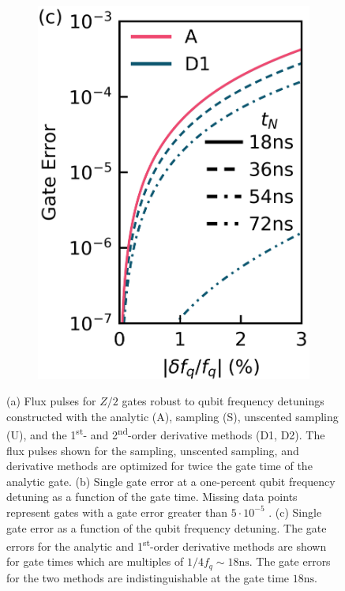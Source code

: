 \begin{figure}[ht]
\begin{subfigure}{.4\textwidth}
    \caption{\label{fig:staticb}}
  \end{subfigure}\hfill
  \begin{subfigure}{.23\textwidth}
    \includegraphics[width=\linewidth]{assets/f2c.png}
    \caption{\label{fig:staticc}}
  \end{subfigure}
  \caption{
    (a) Flux pulses for $Z/2$ gates robust to qubit frequency detunings constructed with the
    analytic (A), sampling (S), unscented sampling (U), and the 1\textsuperscript{st}-
    and 2\textsuperscript{nd}-order derivative methods (D1, D2). The flux pulses shown
    for the sampling, unscented sampling, and derivative methods are optimized
    for twice the gate time of the analytic gate.
    (b) Single gate error at a one-percent qubit frequency detuning as
    a function of the gate time. Missing
    data points represent gates with a gate error greater than $5 \cdot 10^{-5}$
    .
    (c) Single gate error as a function of the qubit frequency detuning.
    The gate errors for the analytic and 1\textsuperscript{st}-order derivative
    methods are shown for gate times which are multiples of $1 / 4 f_{q} \sim 18 \textrm{ns}$.
    The gate errors for the two methods are
    indistinguishable at the gate time $18 \textrm{ns}$.
  }
  \label{fig:static}
\end{figure}

